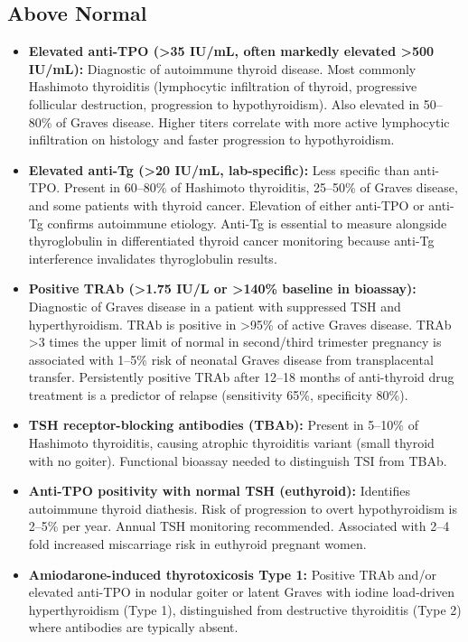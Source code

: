 \subsection*{Above Normal}
\begin{itemize}
  \item \textbf{Elevated anti-TPO (>35 IU/mL, often markedly elevated >500 IU/mL):} Diagnostic of autoimmune thyroid disease. Most commonly Hashimoto thyroiditis (lymphocytic infiltration of thyroid, progressive follicular destruction, progression to hypothyroidism). Also elevated in 50--80\% of Graves disease. Higher titers correlate with more active lymphocytic infiltration on histology and faster progression to hypothyroidism.
  \item \textbf{Elevated anti-Tg (>20 IU/mL, lab-specific):} Less specific than anti-TPO. Present in 60--80\% of Hashimoto thyroiditis, 25--50\% of Graves disease, and some patients with thyroid cancer. Elevation of either anti-TPO or anti-Tg confirms autoimmune etiology. Anti-Tg is essential to measure alongside thyroglobulin in differentiated thyroid cancer monitoring because anti-Tg interference invalidates thyroglobulin results.
  \item \textbf{Positive TRAb (>1.75 IU/L or >140\% baseline in bioassay):} Diagnostic of Graves disease in a patient with suppressed TSH and hyperthyroidism. TRAb is positive in >95\% of active Graves disease. TRAb >3 times the upper limit of normal in second/third trimester pregnancy is associated with 1--5\% risk of neonatal Graves disease from transplacental transfer. Persistently positive TRAb after 12--18 months of anti-thyroid drug treatment is a predictor of relapse (sensitivity 65\%, specificity 80\%).
  \item \textbf{TSH receptor-blocking antibodies (TBAb):} Present in 5--10\% of Hashimoto thyroiditis, causing atrophic thyroiditis variant (small thyroid with no goiter). Functional bioassay needed to distinguish TSI from TBAb.
  \item \textbf{Anti-TPO positivity with normal TSH (euthyroid):} Identifies autoimmune thyroid diathesis. Risk of progression to overt hypothyroidism is 2--5\% per year. Annual TSH monitoring recommended. Associated with 2--4 fold increased miscarriage risk in euthyroid pregnant women.
  \item \textbf{Amiodarone-induced thyrotoxicosis Type 1:} Positive TRAb and/or elevated anti-TPO in nodular goiter or latent Graves with iodine load-driven hyperthyroidism (Type 1), distinguished from destructive thyroiditis (Type 2) where antibodies are typically absent.
\end{itemize}

